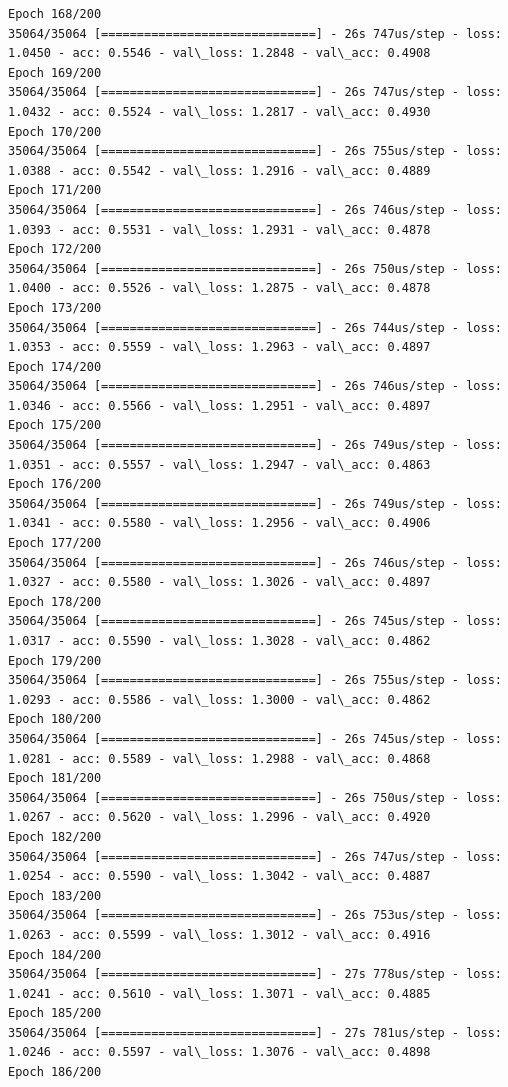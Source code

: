 \documentclass[11pt]{article}
\begin{document}
\begin{Verbatim}[commandchars=\\\{\}]
Epoch 168/200
35064/35064 [==============================] - 26s 747us/step - loss: 1.0450 - acc: 0.5546 - val\_loss: 1.2848 - val\_acc: 0.4908
Epoch 169/200
35064/35064 [==============================] - 26s 747us/step - loss: 1.0432 - acc: 0.5524 - val\_loss: 1.2817 - val\_acc: 0.4930
Epoch 170/200
35064/35064 [==============================] - 26s 755us/step - loss: 1.0388 - acc: 0.5542 - val\_loss: 1.2916 - val\_acc: 0.4889
Epoch 171/200
35064/35064 [==============================] - 26s 746us/step - loss: 1.0393 - acc: 0.5531 - val\_loss: 1.2931 - val\_acc: 0.4878
Epoch 172/200
35064/35064 [==============================] - 26s 750us/step - loss: 1.0400 - acc: 0.5526 - val\_loss: 1.2875 - val\_acc: 0.4878
Epoch 173/200
35064/35064 [==============================] - 26s 744us/step - loss: 1.0353 - acc: 0.5559 - val\_loss: 1.2963 - val\_acc: 0.4897
Epoch 174/200
35064/35064 [==============================] - 26s 746us/step - loss: 1.0346 - acc: 0.5566 - val\_loss: 1.2951 - val\_acc: 0.4897
Epoch 175/200
35064/35064 [==============================] - 26s 749us/step - loss: 1.0351 - acc: 0.5557 - val\_loss: 1.2947 - val\_acc: 0.4863
Epoch 176/200
35064/35064 [==============================] - 26s 749us/step - loss: 1.0341 - acc: 0.5580 - val\_loss: 1.2956 - val\_acc: 0.4906
Epoch 177/200
35064/35064 [==============================] - 26s 746us/step - loss: 1.0327 - acc: 0.5580 - val\_loss: 1.3026 - val\_acc: 0.4897
Epoch 178/200
35064/35064 [==============================] - 26s 745us/step - loss: 1.0317 - acc: 0.5590 - val\_loss: 1.3028 - val\_acc: 0.4862
Epoch 179/200
35064/35064 [==============================] - 26s 755us/step - loss: 1.0293 - acc: 0.5586 - val\_loss: 1.3000 - val\_acc: 0.4862
Epoch 180/200
35064/35064 [==============================] - 26s 745us/step - loss: 1.0281 - acc: 0.5589 - val\_loss: 1.2988 - val\_acc: 0.4868
Epoch 181/200
35064/35064 [==============================] - 26s 750us/step - loss: 1.0267 - acc: 0.5620 - val\_loss: 1.2996 - val\_acc: 0.4920
Epoch 182/200
35064/35064 [==============================] - 26s 747us/step - loss: 1.0254 - acc: 0.5590 - val\_loss: 1.3042 - val\_acc: 0.4887
Epoch 183/200
35064/35064 [==============================] - 26s 753us/step - loss: 1.0263 - acc: 0.5599 - val\_loss: 1.3012 - val\_acc: 0.4916
Epoch 184/200
35064/35064 [==============================] - 27s 778us/step - loss: 1.0241 - acc: 0.5610 - val\_loss: 1.3071 - val\_acc: 0.4885
Epoch 185/200
35064/35064 [==============================] - 27s 781us/step - loss: 1.0246 - acc: 0.5597 - val\_loss: 1.3076 - val\_acc: 0.4898
Epoch 186/200

\end{Verbatim}
\end{document}
